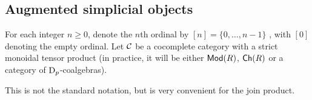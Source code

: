 %
%
%
%
%
\subsection{Augmented simplicial objects}\label{s:simplices}

For each integer $n \geq 0$, denote the $n$th ordinal by $[n] = \{0,\dots,n-1\}$ , with $[0]$ denoting the empty ordinal. Let $\mathcal{C}$ be a cocomplete category with a strict monoidal tensor product (in practice, it will be either $\mathsf{Mod}(R)$, $\mathsf{Ch}(R)$ or a category of $\mathrm{D}_p$-coalgebras).


\begin{warning}
	This is not the standard notation, but is very convenient for the join product.
\end{warning}

